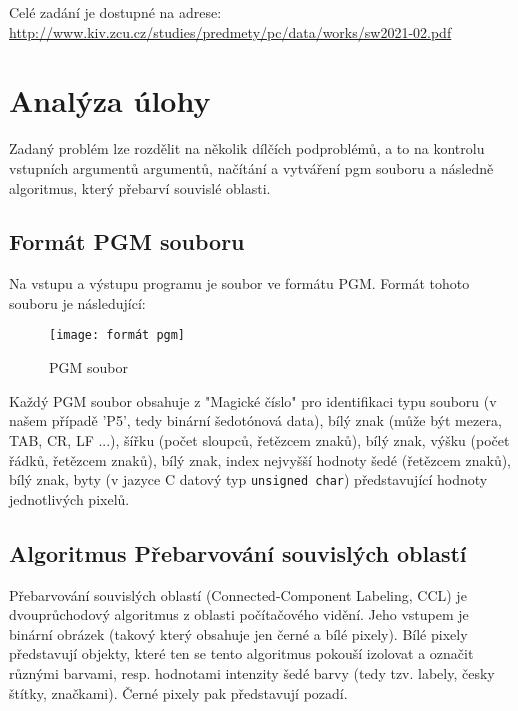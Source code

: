 \documentclass[12pt, a4paper]{article}
\begin{document}
\vspace{0.5cm}
\noindent Celé zadání je dostupné na adrese: \url{http://www.kiv.zcu.cz/studies/predmety/pc/data/works/sw2021-02.pdf}


\section{Analýza úlohy}
Zadaný problém lze rozdělit na několik dílčích podproblémů, a to na kontrolu vstupních argumentů argumentů, načítání a vytváření pgm souboru a následně algoritmus, který přebarví souvislé oblasti.
\subsection{Formát PGM souboru}
\label{s:2}
Na vstupu a výstupu programu je soubor ve formátu PGM. Formát tohoto souboru je následující:

\begin{wrapfigure}{l}{0.4\textwidth}
    \texttt{[image: formát pgm]}
    \caption{PGM soubor}
\end{wrapfigure}
Každý PGM soubor obsahuje z  "Magické číslo" pro identifikaci typu souboru (v našem případě 'P5', tedy binární šedotónová data), bílý znak (může být mezera, TAB, CR, LF ...), šířku (počet sloupců, řetězcem znaků), bílý znak, výšku (počet řádků, řetězcem znaků), bílý znak, index nejvyšší hodnoty šedé (řetězcem znaků), bílý znak, byty (v jazyce C datový typ \texttt{unsigned char}) představující hodnoty jednotlivých pixelů.

\subsection{Algoritmus Přebarvování souvislých oblastí}
Přebarvování souvislých oblastí (Connected-Component Labeling, CCL) je dvouprůchodový algoritmus z oblasti počítačového vidění. Jeho vstupem je binární obrázek (takový který obsahuje jen černé a bílé pixely). Bílé pixely představují objekty, které ten se tento algoritmus pokouší izolovat a označit různými barvami, resp. hodnotami intenzity šedé barvy (tedy tzv. labely, česky štítky, značkami). Černé pixely pak představují pozadí.
\end{document}
